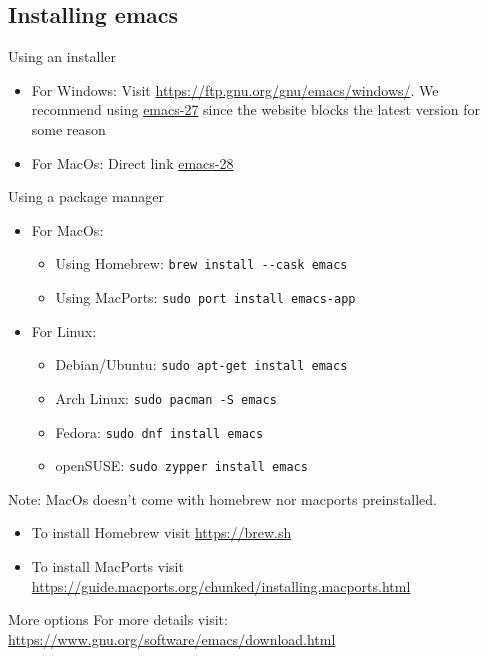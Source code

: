 \subsection{Installing emacs}

\begin{frame}[fragile]{Using an installer}

  \begin{itemize}
  \item For Windows: Visit \url{https://ftp.gnu.org/gnu/emacs/windows/}.
    We recommend using
    \href{https://ftp.gnu.org/gnu/emacs/windows/emacs-27/emacs-27.1-x86_64-installer.exe}
    {emacs-27}  
    since the website blocks the latest version for some reason
  \item For MacOs: Direct
    link
    \href{https://emacsformacosx.com/emacs-builds/Emacs-28.2-universal.dmg}{emacs-28} 
  \end{itemize}
\end{frame}

\begin{frame}[fragile]{Using a package manager}
  \begin{itemize}
  \item For MacOs:
    \begin{itemize}
    \item Using Homebrew: \verb|brew install --cask emacs|
    \item Using MacPorts: \verb|sudo port install emacs-app|
    \end{itemize}
  \item For Linux:
    \begin{itemize}
    \item Debian/Ubuntu: \verb|sudo apt-get install emacs|
    \item Arch Linux: \verb|sudo pacman -S emacs|
    \item Fedora: \verb|sudo dnf install emacs|
    \item openSUSE: \verb|sudo zypper install emacs|
    \end{itemize}
  \end{itemize}

  Note: MacOs doesn't come with homebrew nor macports
  preinstalled.
  \begin{itemize}
  \item To install Homebrew visit \url{https://brew.sh}
  \item To install MacPorts visit \url{https://guide.macports.org/chunked/installing.macports.html}
  \end{itemize}
\end{frame}

\begin{frame}[fragile]{More options}
  For more details visit: \url{https://www.gnu.org/software/emacs/download.html}
\end{frame}